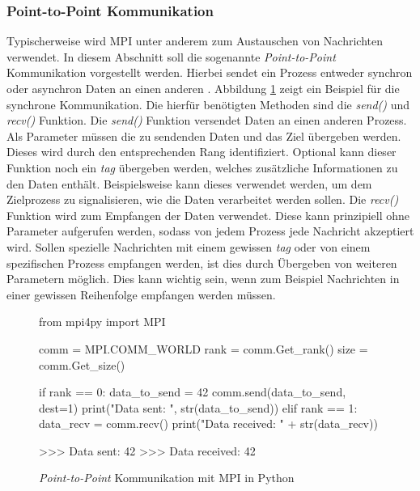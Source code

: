 \subsubsection{Point-to-Point Kommunikation}
\label{subsubsec:point_to_point_communication}
Typischerweise wird \ac{MPI} unter anderem zum Austauschen von Nachrichten verwendet. In diesem Abschnitt soll die sogenannte \emph{Point-to-Point} Kommunikation vorgestellt werden. Hierbei sendet ein Prozess entweder synchron oder asynchron Daten an einen anderen \cite{nielsen2016introduction}. Abbildung \ref{fix:example_point_to_point} zeigt ein Beispiel für die synchrone Kommunikation. Die hierfür benötigten Methoden sind die \emph{send()} und \emph{recv()} Funktion. Die \emph{send()} Funktion versendet Daten an einen anderen Prozess. Als Parameter müssen die zu sendenden Daten und das Ziel übergeben werden. Dieses wird durch den entsprechenden Rang identifiziert. Optional kann dieser Funktion noch ein \emph{tag} übergeben werden, welches zusätzliche Informationen zu den Daten enthält. Beispielsweise kann dieses verwendet werden, um dem Zielprozess zu signalisieren, wie die Daten verarbeitet werden sollen. Die \emph{recv()} Funktion wird zum Empfangen der Daten verwendet. Diese kann prinzipiell ohne Parameter aufgerufen werden, sodass von jedem Prozess jede Nachricht akzeptiert wird. Sollen spezielle Nachrichten mit einem gewissen \emph{tag} oder von einem spezifischen Prozess empfangen werden, ist dies durch Übergeben von weiteren Parametern möglich. Dies kann wichtig sein, wenn zum Beispiel Nachrichten in einer gewissen Reihenfolge empfangen werden müssen. 
\begin{figure}
	\begin{python}
		from mpi4py import MPI
		
		comm = MPI.COMM_WORLD
		rank = comm.Get_rank()
		size = comm.Get_size()
		
		if rank == 0:
			data_to_send = 42
			comm.send(data_to_send, dest=1)
			print("Data sent: ", str(data_to_send))
		elif rank == 1:
			data_recv = comm.recv()
			print("Data received: " + str(data_recv))
			
		>>> Data sent:  42
		>>> Data received: 42
	\end{python}
	\label{fix:example_point_to_point}
	\caption{\emph{Point-to-Point} Kommunikation mit \ac{MPI} in Python}
\end{figure}
\\\\
